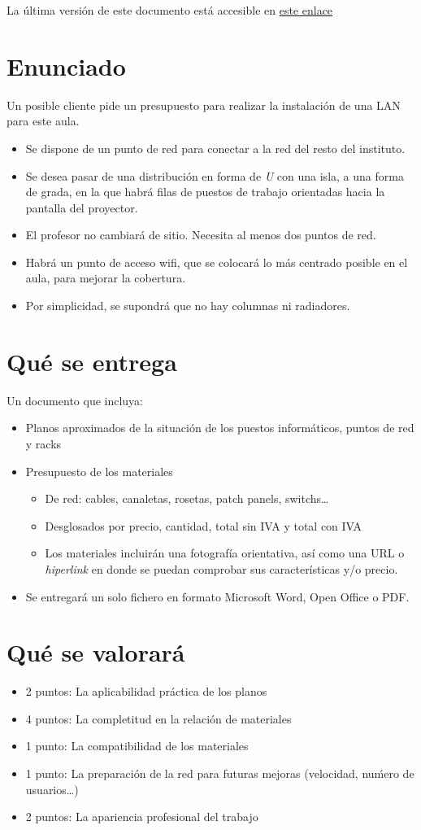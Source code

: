 \documentclass[a4paper]{article}
\begin{document}
La última versión de este documento está accesible en \href{https://alvarogonzalezsotillo.github.io/apuntes-clase/planificacion-administracion-redes-asir1/apuntes/2/par-2-practica-cableado-aula.pdf}{este enlace}
\section{Enunciado}
\label{sec:org0000003}
Un posible cliente pide un presupuesto para realizar la instalación de una LAN para este aula.
\begin{itemize}
\item Se dispone de un punto de red para conectar a la red del resto del instituto.
\item Se desea pasar de una distribución en forma de \emph{U} con una isla, a una forma de grada, en la que habrá filas de puestos de trabajo orientadas hacia la pantalla del proyector.
\item El profesor no cambiará de sitio. Necesita al menos dos puntos de red.
\item Habrá un punto de acceso wifi, que se colocará lo más centrado posible en el aula, para mejorar la cobertura.
\item Por simplicidad, se supondrá que no hay columnas ni radiadores.
\end{itemize}
\section{Qué se entrega}
\label{sec:org0000006}
Un documento que incluya:
\begin{itemize}
\item Planos aproximados de la situación de los puestos informáticos, puntos de red y racks
\item Presupuesto de los materiales
\begin{itemize}
\item De red: cables, canaletas, rosetas, patch panels, switchs…
\item Desglosados por precio, cantidad, total sin IVA y total con IVA
\item Los materiales incluirán una fotografía orientativa, así como una URL o \emph{hiperlink} en donde se puedan comprobar sus características y/o precio.
\end{itemize}
\item Se entregará un solo fichero en formato Microsoft Word, Open Office o PDF.
\end{itemize}
\section{Qué se valorará}
\label{sec:org0000009}
\begin{itemize}
\item 2 puntos: La aplicabilidad práctica de los planos
\item 4 puntos: La completitud en la relación de materiales
\item 1 punto: La compatibilidad de los materiales
\item 1 punto: La preparación de la red para futuras mejoras (velocidad, nuḿero de usuarios\ldots{})
\item 2 puntos: La apariencia profesional del trabajo
\end{itemize}
\end{document}

